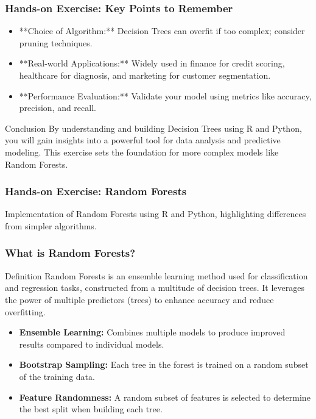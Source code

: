 \documentclass[aspectratio=169]{beamer}
\begin{document}
\begin{frame}[fragile]
    \frametitle{Hands-on Exercise: Key Points to Remember}
    \begin{itemize}
        \item **Choice of Algorithm:** Decision Trees can overfit if too complex; consider pruning techniques.
        \item **Real-world Applications:** Widely used in finance for credit scoring, healthcare for diagnosis, and marketing for customer segmentation.
        \item **Performance Evaluation:** Validate your model using metrics like accuracy, precision, and recall.
    \end{itemize}
    
    \begin{block}{Conclusion}
        By understanding and building Decision Trees using R and Python, you will gain insights into a powerful tool for data analysis and predictive modeling. This exercise sets the foundation for more complex models like Random Forests.
    \end{block}
\end{frame}

\begin{frame}[fragile]
    \frametitle{Hands-on Exercise: Random Forests}
    Implementation of Random Forests using R and Python, highlighting differences from simpler algorithms.
\end{frame}

\begin{frame}[fragile]
    \frametitle{What is Random Forests?}
    \begin{block}{Definition}
        Random Forests is an ensemble learning method used for classification and regression tasks, constructed from a multitude of decision trees.
        It leverages the power of multiple predictors (trees) to enhance accuracy and reduce overfitting.
    \end{block}
    
    \begin{itemize}
        \item \textbf{Ensemble Learning:} Combines multiple models to produce improved results compared to individual models.
        \item \textbf{Bootstrap Sampling:} Each tree in the forest is trained on a random subset of the training data.
        \item \textbf{Feature Randomness:} A random subset of features is selected to determine the best split when building each tree.
    \end{itemize}
\end{frame}
\end{document}
